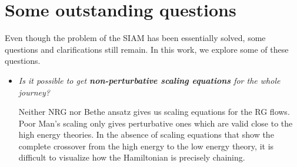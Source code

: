 \section{Some outstanding questions}
Even though the problem of the SIAM has been essentially solved, some questions and clarifications still remain. In this work, we explore some of these questions.
\begin{itemize}
    \item \textit{Is it possible to get \textbf{non-perturbative scaling equations} for the whole journey?}

	    Neither NRG nor Bethe ansatz gives us scaling equations for the RG flows. Poor Man's scaling only gives perturbative ones which are valid close to the high energy theories. In the absence of scaling equations that show the complete crossover from the high energy to the low energy theory, it is difficult to visualize how the Hamiltonian is precisely chaining.


\end{itemize}
